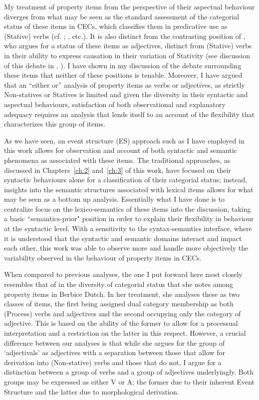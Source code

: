 My treatment of property items from the perspective of their aspectual behaviour diverges from what may be seen as the standard assessment of the categorial status of these items in CECs, which classifies them in predicative use as (Stative) verbs (cf. \citealt{Sebba1986, Alleyne1980}; \citealt{Winford1993}, etc.). It is also distinct from the contrasting position of \citet{Seuren1986}, who argues for a status of these items as adjectives, distinct from (Stative) verbs in their ability to express causation in their variation of Stativity (see discussion of this debate in , ). I have shown in my discussion of the debate surrounding these items that neither of these positions is tenable. Moreover, I have argued that an “either or” analysis of property items as verbs or adjectives, as strictly Non-statives or Statives is limited and given the diversity in their syntactic and aspectual behaviours, satisfaction of both observational and explanatory adequacy requires an analysis that lends itself to an account of the flexibility that characterizes this group of items. 

As we have seen, an event structure (ES) approach such as I have employed in this work allows for observation and account of both syntactic and semantic phenomena as associated with these items. The traditional approaches, as discussed in Chapters~\ref{ch:2} and~\ref{ch:3} of this work, have focused on their syntactic behaviours alone for a classification of their categorial status; instead, insights into the semantic structures associated with lexical items allows for what may be seen as a bottom up analysis. Essentially what I have done is to centralize focus on the lexico-semantics of these items into the discussion, taking a basic ``semantics-prior" position in order to explain their flexibility in behaviour at the syntactic level. With a sensitivity to the syntax-semantics interface, where it is understood that the syntactic and semantic domains interact and impact each other, this work was able to observe more and handle more objectively the variability observed in the behaviour of property items in CECs. 

When compared to previous analyses, the one I put forward here most closely resembles that of \citet{Kouwenberg1996} in the diversity of categorial status that she notes among property items in Berbice Dutch. In her treatment, she analyses these as two classes of items, the first being assigned dual category membership as both (Process) verbs and adjectives and the second occupying only the category of adjective. This is based on the ability of the former to allow for a processual interpretation and a restriction on the latter in this respect. However, a crucial difference between our analyses is that while she argues for the group of ‘adjectivals’ as adjectives with a separation between those that allow for derivation into (Non-stative) verbs and those that do not, I argue for a distinction between a group of verbs and a group of adjectives underlyingly. Both groups may be expressed as either V or A; the former due to their inherent Event Structure and the latter due to morphological derivation. 

